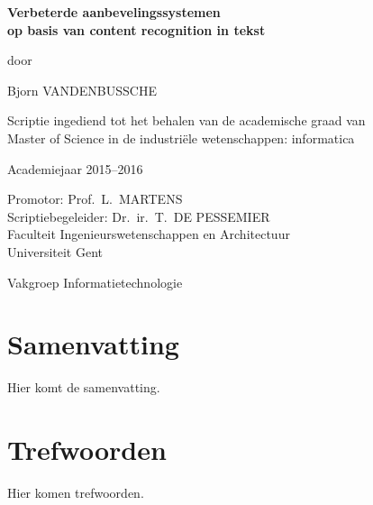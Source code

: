 
\newpage

{
\setlength{\baselineskip}{14pt}
\setlength{\parindent}{0pt}
\setlength{\parskip}{8pt}

\begin{center}

\noindent \textbf{\huge
Verbeterde aanbevelingssystemen\\[8pt]op basis van content recognition in tekst
}

door 

Bjorn VANDENBUSSCHE

Scriptie ingediend tot het behalen van de academische graad van\\ 
Master of Science in de industri\"ele wetenschappen: informatica

Academiejaar 2015--2016

Promotor: Prof.~L.~MARTENS\\
Scriptiebegeleider: Dr.~ir.~T.~DE PESSEMIER\\

Faculteit Ingenieurswetenschappen en Architectuur\\
Universiteit Gent

Vakgroep Informatietechnologie

\end{center}

\section*{Samenvatting}


Hier komt de samenvatting.


\section*{Trefwoorden}


Hier komen trefwoorden.

}

\newpage %
